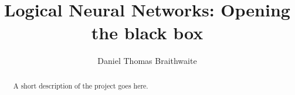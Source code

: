 \documentclass[11pt
              , a4paper
              , twoside
              , openright
              ]{report}
\title{Logical Neural Networks: Opening the black box}
\author{Daniel Thomas Braithwaite}
\date{}
\theoremstyle{definition}
\begin{document}
\frontmatter



\begin{abstract}

A short description of the project goes here.

\end{abstract}


\maketitle

%

\tableofcontents



\mainmatter











\backmatter



%


\end{document}
